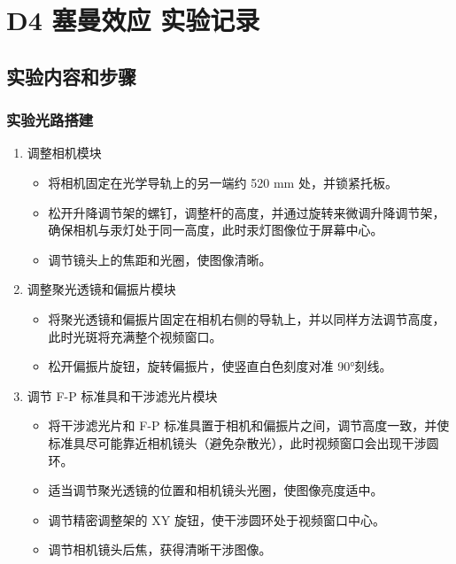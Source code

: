 \documentclass[dvipsnames, svgnames,a4paper,11pt]{article}
\begin{document}
\section{D4 \quad 塞曼效应 \quad\heiti 实验记录}
\subsection{实验内容和步骤}


	\subsubsection{实验光路搭建}
	
		\begin{enumerate}
			
			\item 调整相机模块
				\begin{itemize}
					\item 将相机固定在光学导轨上的另一端约 520 mm 处，并锁紧托板。
					\item 松开升降调节架的螺钉，调整杆的高度，并通过旋转来微调升降调节架，确保相机与汞灯处于同一高度，此时汞灯图像位于屏幕中心。
					\item 调节镜头上的焦距和光圈，使图像清晰。
				\end{itemize}
			
			
			\item 调整聚光透镜和偏振片模块
				
				\begin{itemize}
					\item 将聚光透镜和偏振片固定在相机右侧的导轨上，并以同样方法调节高度，此时光斑将充满整个视频窗口。
					\item 松开偏振片旋钮，旋转偏振片，使竖直白色刻度对准 90°刻线。
				\end{itemize}
			
			\item 调节 F-P 标准具和干涉滤光片模块
				
				\begin{itemize}
					\item 将干涉滤光片和 F-P 标准具置于相机和偏振片之间，调节高度一致，并使标准具尽可能靠近相机镜头（避免杂散光），此时视频窗口会出现干涉圆环。
					\item 适当调节聚光透镜的位置和相机镜头光圈，使图像亮度适中。
					\item 调节精密调整架的 XY 旋钮，使干涉圆环处于视频窗口中心。
					\item 调节相机镜头后焦，获得清晰干涉图像。
				\end{itemize}
			
		\end{enumerate}
	
\end{document}
